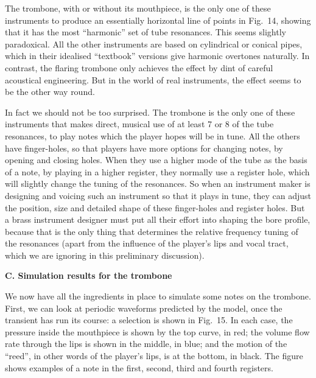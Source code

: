 
  The trombone, with or without its mouthpiece, is the only one of these 
  instruments to produce an essentially horizontal line of points in Fig.\ 14, 
  showing that it has the most “harmonic” set of tube resonances. This seems 
  slightly paradoxical. All the other instruments are based on cylindrical or 
  conical pipes, which in their idealised “textbook” versions give harmonic 
  overtones naturally. In contrast, the flaring trombone only achieves the 
  effect by dint of careful acoustical engineering. But in the world of real 
  instruments, the effect seems to be the other way round. 

  In fact we should not be too surprised. The trombone is the only one of these 
  instruments that makes direct, musical use of at least 7 or 8 of the tube 
  resonances, to play notes which the player hopes will be in tune. All the 
  others have finger-holes, so that players have more options for changing 
  notes, by opening and closing holes. When they use a higher mode of the tube 
  as the basis of a note, by playing in a higher register, they normally use a 
  register hole, which will slightly change the tuning of the resonances. So 
  when an instrument maker is designing and voicing such an instrument so that 
  it plays in tune, they can adjust the position, size and detailed shape of 
  these finger-holes and register holes. But a brass instrument designer must 
  put all their effort into shaping the bore profile, because that is the only 
  thing that determines the relative frequency tuning of the resonances (apart 
  from the influence of the player's lips and vocal tract, which we are 
  ignoring in this preliminary discussion). 

  \textbf{C. Simulation results for the trombone} 

  We now have all the ingredients in place to simulate some notes on the 
  trombone. First, we can look at periodic waveforms predicted by the model, 
  once the transient has run its course: a selection is shown in Fig.\ 15. In 
  each case, the pressure inside the mouthpiece is shown by the top curve, in 
  red; the volume flow rate through the lips is shown in the middle, in blue; 
  and the motion of the “reed”, in other words of the player’s lips, is at the 
  bottom, in black. The figure shows examples of a note in the first, second, 
  third and fourth registers. 

